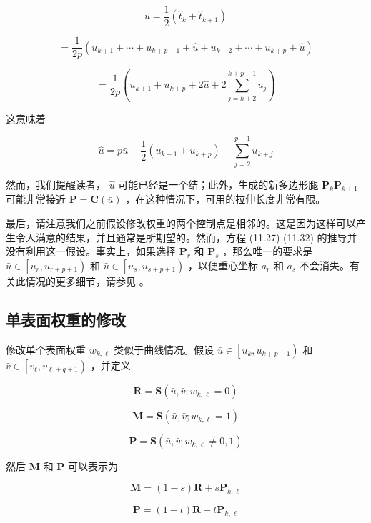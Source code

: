 \documentclass[../main.tex]{subfiles}
\begin{document}
\[
\bar{u} = \frac{1}{2}\left( {{\widehat{t}}_{k} + {\widehat{t}}_{k + 1}}\right)
\]

\[
= \frac{1}{2p}\left( {{u}_{k + 1} + \cdots  + {u}_{k + p - 1} + \widehat{u} + {u}_{k + 2} + \cdots  + {u}_{k + p} + \widehat{u}}\right)
\]

\[
= \frac{1}{2p}\left( {{u}_{k + 1} + {u}_{k + p} + 2\widehat{u} + 2\mathop{\sum }\limits_{{j = k + 2}}^{{k + p - 1}}{u}_{j}}\right)
\]

这意味着

\[
\widehat{u} = p\bar{u} - \frac{1}{2}\left( {{u}_{k + 1} + {u}_{k + p}}\right)  - \mathop{\sum }\limits_{{j = 2}}^{{p - 1}}{u}_{k + j}
\]

然而，我们提醒读者， \(\widehat{u}\) 可能已经是一个结；此外，生成的新多边形腿 \({\mathbf{P}}_{k}{\mathbf{P}}_{k + 1}\) 可能非常接近 \(\mathbf{P} = \mathbf{C}\left( \bar{u}\right)\) ，在这种情况下，可用的拉伸长度非常有限。

最后，请注意我们之前假设修改权重的两个控制点是相邻的。这是因为这样可以产生令人满意的结果，并且通常是所期望的。然而，方程 (11.27)-(11.32) 的推导并没有利用这一假设。事实上，如果选择 \({\mathbf{P}}_{r}\) 和 \({\mathbf{P}}_{s}\) ，那么唯一的要求是 \(\bar{u} \in  \left\lbrack  {{u}_{r},{u}_{r + p + 1}}\right)\) 和 \(\bar{u} \in  \left\lbrack  {{u}_{s},{u}_{s + p + 1}}\right)\) ，以便重心坐标 \({a}_{r}\) 和 \({a}_{s}\) 不会消失。有关此情况的更多细节，请参见 \cite{Pieg89c}。


\subsection{单表面权重的修改}

修改单个表面权重 \({w}_{k,\ell }\) 类似于曲线情况。假设 \(\bar{u} \in  \left\lbrack  {{u}_{k},{u}_{k + p + 1}}\right)\) 和 \(\bar{v} \in  \left\lbrack  {{v}_{\ell },{v}_{\ell  + q + 1}}\right)\) ，并定义

\[
\mathbf{R} = \mathbf{S}\left( {\bar{u},\bar{v};{w}_{k,\ell } = 0}\right)
\]

\[
\mathbf{M} = \mathbf{S}\left( {\bar{u},\bar{v};{w}_{k,\ell } = 1}\right)
\]

\[
\mathbf{P} = \mathbf{S}\left( {\bar{u},\bar{v};{w}_{k,\ell } \neq  0,1}\right)  \tag{11.35}
\]

然后 \(\mathbf{M}\) 和 \(\mathbf{P}\) 可以表示为

\[
\mathbf{M} = \left( {1 - s}\right) \mathbf{R} + s{\mathbf{P}}_{k,\ell }
\]

\[
\mathbf{P} = \left( {1 - t}\right) \mathbf{R} + t{\mathbf{P}}_{k,\ell } \tag{11.36}
\]
\end{document}
